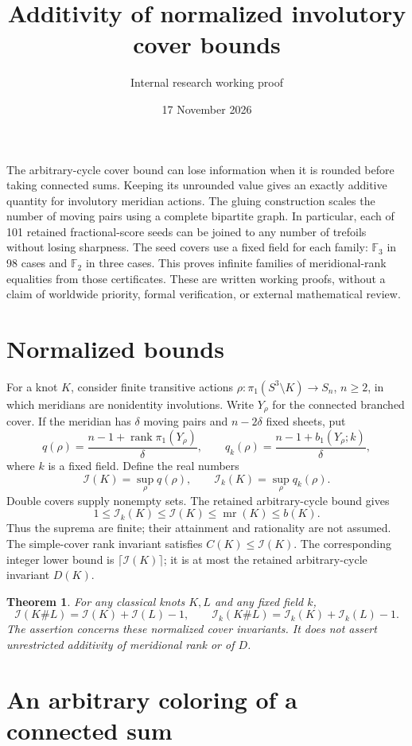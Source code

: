 \documentclass[11pt]{article}
\title{Additivity of normalized involutory cover bounds}
\author{Internal research working proof}
\date{17 November 2026}
\newtheorem{theorem}{Theorem}
\newcommand{\mr}{\operatorname{mr}}
\newcommand{\rank}{\operatorname{rank}}
\newcommand{\I}{\mathcal I}
\newcommand{\F}{\mathbb F}
\begin{document}
\maketitle

The arbitrary-cycle cover bound can lose information when it is rounded
before taking connected sums. Keeping its unrounded value gives an
exactly additive quantity for involutory meridian actions. The gluing
construction scales the number of moving pairs using a complete
bipartite graph. In particular, each of 101 retained fractional-score
seeds can be joined to any number of trefoils without losing
sharpness. The seed covers use a fixed field for each family:
$\F_3$ in 98 cases and $\F_2$ in three cases.
This proves infinite families of meridional-rank equalities from those
certificates. These are written
working proofs, without a claim of worldwide priority, formal
verification, or external mathematical review.

\section{Normalized bounds}

For a knot $K$, consider finite transitive actions
$\rho:\pi_1(S^3\setminus K)\to S_n$, $n\ge2$, in which meridians are
nonidentity involutions. Write $Y_\rho$ for the connected branched cover.
If the meridian has $\delta$ moving pairs and $n-2\delta$ fixed sheets,
put
\[
 q(\rho)=\frac{n-1+\rank\pi_1(Y_\rho)}{\delta},\qquad
 q_k(\rho)=\frac{n-1+b_1(Y_\rho;k)}{\delta},
\]
where $k$ is a fixed field. Define the real numbers
\[
       \I(K)=\sup_\rho q(\rho),\qquad
       \I_k(K)=\sup_\rho q_k(\rho).
\]
Double covers supply nonempty sets. The retained arbitrary-cycle
bound gives
\[
       1\le \I_k(K)\le\I(K)\le\mr(K)\le b(K).
\]
Thus the suprema are finite; their attainment and rationality are not
assumed. The simple-cover rank invariant satisfies $C(K)\le\I(K)$.
The corresponding integer lower bound is $\lceil\I(K)\rceil$; it is at
most the retained arbitrary-cycle invariant $D(K)$.

\begin{theorem}\label{thm:additivity}
For any classical knots $K,L$ and any fixed field $k$,
\[
 \I(K\#L)=\I(K)+\I(L)-1,\qquad
 \I_k(K\#L)=\I_k(K)+\I_k(L)-1.
\]
The assertion concerns these normalized cover invariants. It does not
assert unrestricted additivity of meridional rank or of $D$.
\end{theorem}

\section{An arbitrary coloring of a connected sum}
\end{document}
